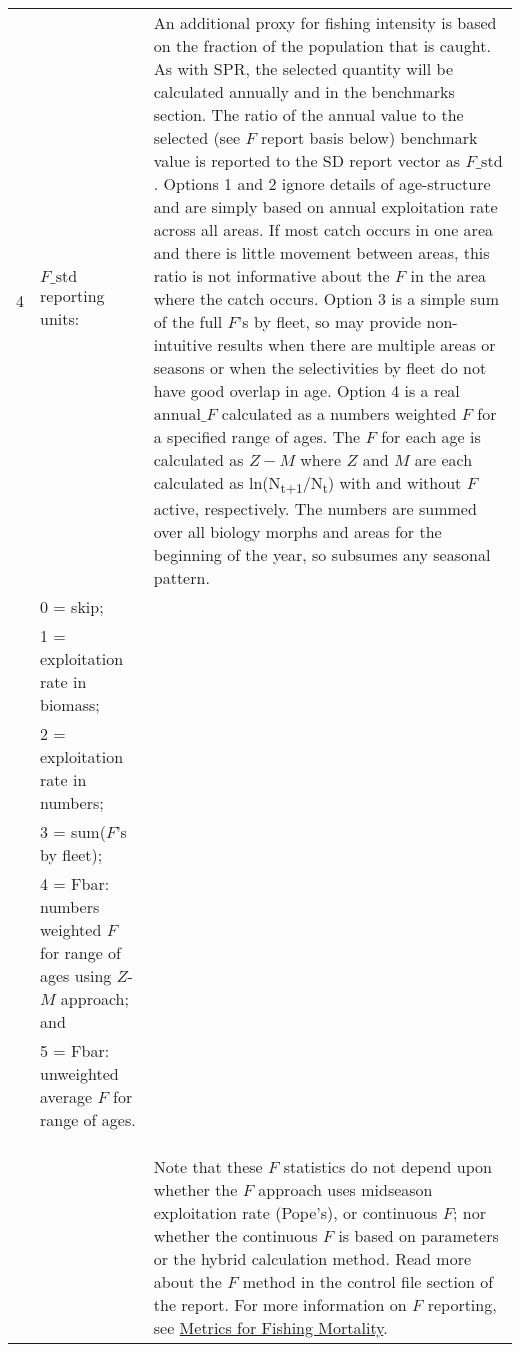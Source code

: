 {\begin{landscape}
\begin{longtable}{p{1.5cm} p{7.2cm} p{12.3cm}}
 \pagebreak
 4 & $F\text{\_std}$ reporting units: & \multirow{1}{1cm}[-0.25cm]{\parbox{12.5cm}{An additional proxy for fishing intensity is based on the fraction of the population that is caught. As with SPR, the selected quantity will be calculated annually and in the benchmarks section. The ratio of the annual value to the selected (see $F$ report basis below) benchmark value is reported to the SD report vector as $F\text{\_std}$. Options 1 and 2 ignore details of age-structure and are simply based on annual exploitation rate across all areas. If most catch occurs in one area and there is little movement between areas, this ratio is not informative about the $F$ in the area where the catch occurs. Option 3 is a simple sum of the full $F$'s by fleet, so may provide non-intuitive results when there are multiple areas or seasons or when the selectivities by fleet do not have good overlap in age. Option 4 is a real $\text{annual\_}F$ calculated as a numbers weighted $F$ for a specified range of ages. The $F$ for each age is calculated as $Z-M$ where $Z$ and $M$ are each calculated as ln(N\textsubscript{t+1}/N\textsubscript{t}) with and without $F$ active, respectively. The numbers are summed over all biology morphs and areas for the beginning of the year, so subsumes any seasonal pattern.}} \Tstrut\Bstrut\\
   & 0 = skip; & \\
   & 1 = exploitation rate in biomass; & \\
   & 2 = exploitation rate in numbers; & \\
   & 3 = sum($F$'s by fleet); & \\
   & 4 = Fbar: numbers weighted $F$ for range of ages using $Z$-$M$ approach; and & \\
   & 5 = Fbar: unweighted average $F$ for range of ages. & \\
   & & \\
   & & \Bstrut\\
   & & \Bstrut\\
   & & Note that these $F$ statistics do not depend upon whether the $F$ approach uses midseason exploitation rate (Pope's), or continuous $F$; nor whether the continuous $F$ is based on parameters or the hybrid calculation method. Read more about the $F$ method in the control file section of the report. For more information on $F$ reporting, see \hyperlink{FMortality}{Metrics for Fishing Mortality}. \Bstrut\\ 
  

\end{longtable}
\end{landscape}}
